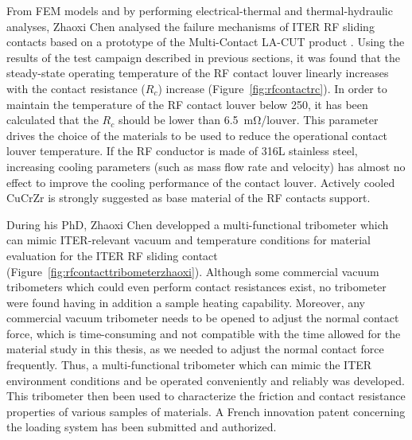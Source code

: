 {From FEM models and by performing electrical-thermal and thermal-hydraulic analyses, Zhaoxi Chen analysed the failure mechanisms of ITER RF sliding contacts based on a prototype of the Multi-Contact LA-CUT product . Using the results of the test campaign described in previous sections, it was found that the steady-state operating temperature of the RF contact louver linearly increases with the contact resistance ($R_c$) increase (Figure~\ref{fig:rfcontactrc}). In order to maintain the temperature of the RF contact louver below 250\degC, it has been calculated that the $R_c$ should be lower than 6.5~$\si{\milli\ohm}$/louver. This parameter drives the choice of the materials to be used to reduce the operational contact louver temperature. If the RF conductor is made of 316L stainless steel, increasing cooling parameters (such as mass flow rate and velocity) has almost no effect to improve the cooling performance of the contact louver. Actively cooled CuCrZr is strongly suggested as base material of the RF contacts support. 

During his PhD, Zhaoxi Chen developped a multi-functional tribometer  which can mimic ITER-relevant vacuum and temperature conditions for material evaluation for the ITER RF sliding contact (Figure~\ref{fig:rfcontacttribometerzhaoxi}). Although some commercial vacuum tribometers which could even perform contact resistances exist, no tribometer were found having in addition a sample heating capability. Moreover, any commercial vacuum tribometer needs to be opened to adjust the normal contact force, which is time-consuming and not compatible with the time allowed for the material study in this thesis, as we needed to adjust the normal contact force frequently. Thus, a multi-functional tribometer which can mimic the ITER environment conditions and be operated conveniently and reliably was developed. This tribometer then been used to characterize the friction and contact resistance properties of various samples of materials. A French innovation patent concerning the loading system has been submitted and authorized.   


}
